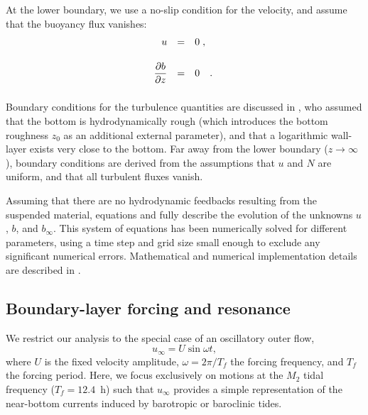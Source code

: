 At the lower boundary, we use a no-slip condition for the velocity,
and assume that the buoyancy flux vanishes:
\begin{equation}
  \label{bound}
  \begin{array}{rcl}
    u
    &=& 
    0 \; , \quad  \\[5mm]
    \dfrac{\partial {b}}{\partial {z}} &=&	 0                                 \quad . \\[5mm]
   \end{array}
\end{equation}
Boundary conditions for the turbulence quantities are discussed in
\cite{UmlaufBurchard2011a}, who assumed that the bottom is
hydrodynamically rough (which introduces the bottom roughness $z_0$ as
an additional external parameter), and that a logarithmic wall-layer
exists very close to the bottom. Far away from the lower boundary ($z
\rightarrow \infty$), boundary conditions are derived from the
assumptions that $u$ and $N$ are uniform, and that all turbulent fluxes
vanish.

Assuming that there are no hydrodynamic feedbacks resulting from the
suspended material, equations  and  fully describe
the evolution of the unknowns $u$, $b$, and $b_\infty$. This system of
equations has been numerically solved for different parameters, using
a time step and grid size small enough to exclude any significant
numerical errors. Mathematical and numerical implementation details
are described in \cite{Umlaufetal2005a}.

\subsection{Boundary-layer forcing and resonance}
We restrict our analysis to the special case of an oscillatory outer flow,
\begin{equation}
  \label{uinfty}
  u_\infty = U \sin \omega t
  \comma
\end{equation}
where $U$ is the fixed velocity amplitude, $\omega=2 \pi /T_f$ the
forcing frequency, and $T_f$ the forcing period. Here, we focus
exclusively on motions at the $M_2$ tidal frequency ($T_f=12.4$~h)
such that $u_\infty$ provides a simple representation of the
near-bottom currents induced by barotropic or baroclinic tides.

